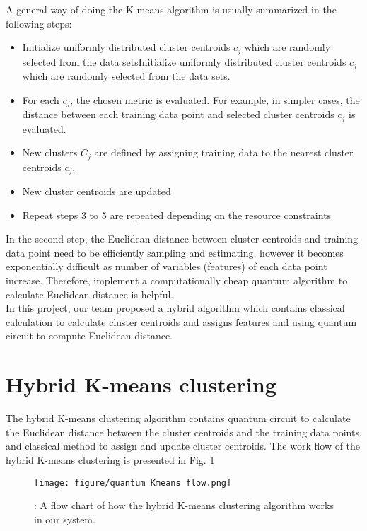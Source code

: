 \documentclass{article}
\begin{document}
A general way of doing the K-means algorithm is usually summarized in the following steps:
\begin{itemize}
    \item Initialize uniformly distributed cluster centroids $c_j$ which are randomly selected from the data setsInitialize uniformly distributed cluster centroids $c_j$ which are randomly selected from the data sets.
    \item For each $c_j$, the chosen metric is evaluated. For example, in simpler cases, the distance between each training data point and selected cluster centroids $c_j$ is evaluated.
    \item New clusters $C_j$ are defined by assigning training data to the nearest cluster centroids $c_j$.
    \item New cluster centroids are updated
    \item Repeat steps 3 to 5 are repeated depending on the resource constraints
\end{itemize}
In the second step, the Euclidean distance between cluster centroids and training data point need to be efficiently sampling and estimating, however it becomes exponentially difficult as number of variables (features) of each data point increase. Therefore, implement a computationally cheap quantum algorithm to calculate Euclidean distance is helpful.\\

In this project, our team proposed a hybrid algorithm which contains classical calculation to calculate cluster centroids and assigns features and using quantum circuit to compute Euclidean distance. 

\section{Hybrid K-means clustering}
The hybrid K-means clustering algorithm contains quantum circuit to calculate the Euclidean distance between the cluster centroids and the training data points, and classical method to assign and update cluster centroids. The work flow of the hybrid K-means clustering is presented in Fig. \ref{fig:qkmeans}

\begin{figure}[h]
    \centering
    \texttt{[image: figure/quantum Kmeans flow.png]}
    \caption{: A flow chart of how the hybrid K-means clustering algorithm works in our system.}
    \label{fig:qkmeans}
\end{figure}
\end{document}
